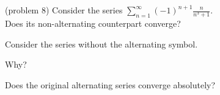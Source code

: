 \documentclass{ximera}
\begin{document}
\begin{problem}(problem 8)
Consider the series $\displaystyle{\sum_{n=1}^\infty (-1)^{n+1} \frac{n}{n^3 + 1}}$.\\
Does its non-alternating counterpart converge?
\begin{hint} 
Consider the series without the alternating symbol.
\end{hint}
\begin{multipleChoice}
\end{multipleChoice}

Why?
\begin{multipleChoice}
\end{multipleChoice}



Does the original alternating series converge absolutely?
\begin{multipleChoice}
\end{multipleChoice}

\end{problem}
\end{document}
